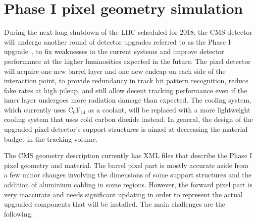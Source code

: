\section{Phase I pixel geometry simulation\label{sec:matbudg-phase1}}

During the next long shutdown of the LHC scheduled for 2018, the CMS detector will undergo another round of detector upgrades referred to as the Phase I upgrade~\cite{Dominguez:1481838}, to fix weaknesses in the current systems and improve detector performance at the higher luminosities expected in the future. The pixel detector will acquire one new barrel layer and one new endcap on each side of the interaction point, to provide redundancy in track hit pattern recognition, reduce fake rates at high pileup, and still allow decent tracking performance even if the inner layer undergoes more radiation damage than expected. The cooling system, which currently uses C$_{6}$F$_{14}$ as a coolant, will be replaced with a more lightweight cooling system that uses cold carbon dioxide instead. In general, the design of the upgraded pixel detector's support structures is aimed at decreasing the material budget in the tracking volume.

The CMS geometry description currently has XML files that describe the Phase I pixel geometry and material. The barrel pixel part is mostly accurate aside from a few minor changes involving the dimensions of some support structures and the addition of aluminium cabling in some regions. However, the forward pixel part is very inaccurate and needs significant updating in order to represent the actual upgraded components that will be installed. The main challenges are the following:

